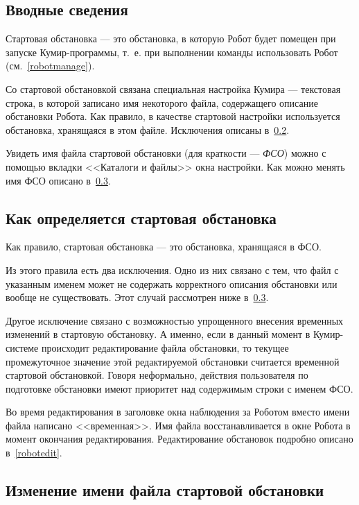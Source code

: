 \subsection{Вводные сведения}

Стартовая обстановка --- это обстановка, в которую Робот будет помещен при запуске Кумир-программы, т.~е. при выполнении команды \textsf{использовать Робот} (см.~\ref{robotmanage}).

Со стартовой обстановкой связана специальная настройка Кумира --- текстовая строка, в которой записано имя некоторого файла, содержащего описание обстановки Робота.  Как правило, в качестве стартовой настройки используется обстановка, хранящаяся в этом файле. Исключения описаны в~\ref{robotstartfielddefine}.

Увидеть имя файла стартовой обстановки (для краткости --- \emph{ФСО}) можно с помощью вкладки <<Каталоги и файлы>> окна настройки. Как можно менять имя ФСО описано в~\ref{robotchangefso}.
	
\subsection{Как определяется стартовая обстановка}
\label{robotstartfielddefine}

Как правило, стартовая обстановка --- это обстановка, хранящаяся в ФСО.

Из этого правила есть два исключения. Одно из них связано с тем, что файл с указанным именем может не содержать корректного описания обстановки или вообще не существовать. Этот случай рассмотрен ниже в~\ref{robotchangefso}.

Другое исключение связано с возможностью упрощенного внесения временных изменений в стартовую обстановку. А именно, если в данный момент в Кумир-системе происходит редактирование файла обстановки, то текущее промежуточное значение этой редактируемой обстановки считается временной стартовой обстановкой. Говоря неформально, действия пользователя по подготовке обстановки имеют приоритет над содержимым строки с именем ФСО.

Во время редактирования в заголовке окна наблюдения за Роботом вместо имени файла написано <<временная>>. Имя файла восстанавливается в окне Робота в момент окончания редактирования. Редактирование обстановок подробно описано в~\ref{robotedit}.

\subsection{Изменение имени файла стартовой обстановки}
\label{robotchangefso}

